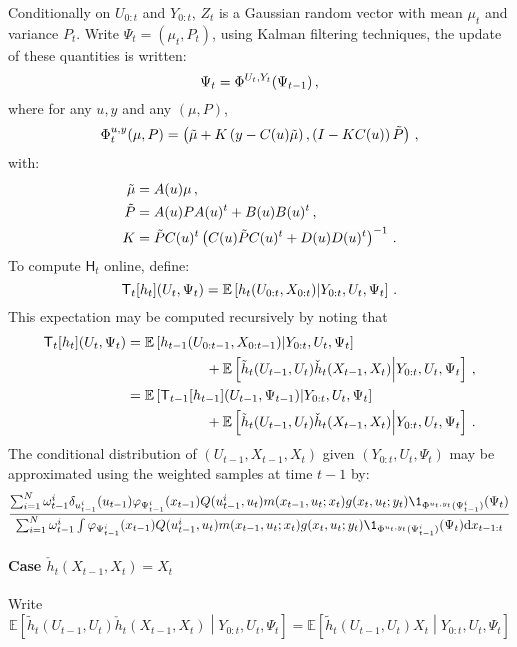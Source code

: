 Conditionally on $U_{0:t}$ and $Y_{0:t}$, $Z_t$ is a Gaussian random vector with mean $\mu_t$ and variance $P_t$. Write $\Psi_t = (\mu_{t},P_{t})$, using Kalman filtering techniques, the update of these quantities is written:
\[
\Psi_t = \Phi^{U_t,Y_t}(\Psi_{t-1})\,,
\]
where for any $u,y$ and any $(\mu,P)$, 
\[
\Phi_t^{u,y}(\mu,P) = \left(\tilde{\mu} + K\left(y - C(u)\tilde{\mu}\right),\left(I-KC(u)\right)\tilde{P}\right)\,,
\] 
with:
\begin{align*}
\tilde{\mu} &= A(u)\mu\,,\\
\tilde{P} &= A(u)PA(u)^t + B(u)B(u)^t\,,\\
K  &=  \tilde{P}C(u)^t\left(C(u)\tilde{P}C(u)^t + D(u)D(u)^t \right)^{-1}\,.
\end{align*}
To compute $\mathsf{H}_t $ online, define: 
\[
\mathsf{T}_t[h_t](U_t,\Psi_t) = \mathbb{E}\left[h_t(U_{0:t},X_{0:t})\middle|Y_{0:t},U_t,\Psi_t\right]\,.
\]
This expectation may be computed recursively by noting that
\begin{align*}
\mathsf{T}_t[h_t](U_t,\Psi_t) &= \mathbb{E}\left[h_{t-1}(U_{0:t-1},X_{0:t-1})\middle|Y_{0:t},U_t,\Psi_t\right] \\
&\hspace{2cm}+ \mathbb{E}\left[\tilde{h}_t(U_{t-1},U_t)\check{h}_t(X_{t-1},X_t)\middle|Y_{0:t},U_t,\Psi_t\right]\,,\\
&= \mathbb{E}\left[\mathsf{T}_{t-1}[h_{t-1}](U_{t-1},\Psi_{t-1}) \middle|Y_{0:t},U_{t},\Psi_t\right] \\
&\hspace{2cm}+ \mathbb{E}\left[\tilde{h}_t(U_{t-1},U_t)\check{h}_t(X_{t-1},X_t)\middle|Y_{0:t},U_t,\Psi_t\right]\,.
\end{align*}
The conditional distribution of $(U_{t-1},X_{t-1},X_t)$ given $(Y_{0:t},U_t,\Psi_t)$ may be approximated using the weighted samples at time $t-1$ by:
\[
\frac{\sum_{i=1}^N\omega_{t-1}^i \delta_{u^i_{t-1}}(u_{t-1})\varphi_{\Psi^i_{t-1}}(x_{t-1})Q(u^i_{t-1},u_t)m(x_{t-1},u_t;x_t)g(x_t,u_t;y_t)\1_{\Phi^{u_t,y_t}(\Psi^i_{t-1})}(\Psi_t)}{\sum_{i=1}^N\omega_{t-1}^i \int\varphi_{\Psi^i_{t-1}}(x_{t-1})Q(u^i_{t-1},u_t)m(x_{t-1},u_t;x_t)g(x_t,u_t;y_t)\1_{\Phi^{u_t,y_t}(\Psi^i_{t-1})}(\Psi_t)\rmd x_{t-1:t}}
\]
\paragraph{Case $\check{h}_t(X_{t-1},X_t) = X_t$}
Write
\[
\mathbb{E}\left[\tilde{h}_t(U_{t-1},U_t)\check{h}_t(X_{t-1},X_t)\middle|Y_{0:t},U_t,\Psi_t\right] = \mathbb{E}\left[\tilde{h}_t(U_{t-1},U_t)X_t\middle|Y_{0:t},U_t,\Psi_t\right] 
\]

